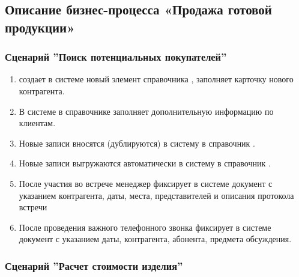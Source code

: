 



\subsection{Описание бизнес-процесса «Продажа готовой продукции»}

\subsubsection{Сценарий ''Поиск потенциальных покупателей''}
\label{bp:sales_1}

\begin{enumerate}
    \item \manager создает в системе \gofro новый элемент справочника  , заполняет карточку нового контрагента.
    \item	В системе \gofro в справочнике   \manager заполняет дополнительную информацию по клиентам.
    \item	Новые записи вносятся (дублируются) в систему \unf в справочник .
    \item	Новые записи выгружаются автоматически в систему \unf в справочник .

 \item	После участия во встрече менеджер фиксирует в системе \gofro документ  с указанием контрагента, даты, места, представителей и описания протокола встречи
 \item	После проведения важного телефонного звонка \manager фиксирует в системе \gofro документ  с указанием даты, контрагента, абонента, предмета обсуждения.
\end{enumerate}


\subsubsection{Сценарий ''Расчет стоимости изделия''}
\label{bp:sales_2}



